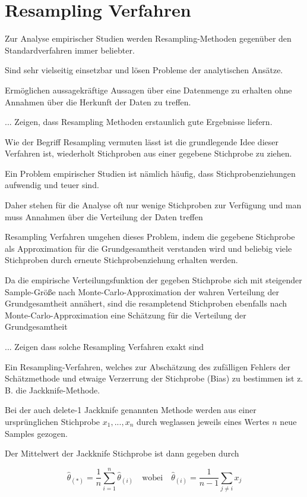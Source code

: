 \section{Resampling Verfahren}
Zur Analyse empirischer Studien werden Resampling-Methoden gegenüber den Standardverfahren immer beliebter.

Sind sehr vielseitig einsetzbar und lösen Probleme der analytischen Ansätze.

Ermöglichen aussagekräftige Aussagen über eine Datenmenge zu erhalten ohne Annahmen über die Herkunft der Daten zu treffen.

... Zeigen, dass Resampling Methoden erstaunlich gute Ergebnisse liefern.

Wie der Begriff Resampling vermuten lässt ist die grundlegende Idee dieser Verfahren ist, wiederholt Stichproben aus einer gegebene Stichprobe zu ziehen.

Ein Problem empirischer Studien ist nämlich häufig, dass Stichprobenziehungen aufwendig und teuer sind.

Daher stehen für die Analyse oft nur wenige Stichproben zur Verfügung und man muss Annahmen über die Verteilung der Daten treffen

Resampling Verfahren umgehen dieses Problem, indem die gegebene Stichprobe als Approximation für die Grundgesamtheit verstanden wird und beliebig viele Stichproben durch erneute Stichprobenziehung erhalten werden.

Da die empirische Verteilungsfunktion der gegeben Stichprobe sich mit steigender Sample-Größe nach Monte-Carlo-Approximation der wahren Verteilung der Grundgesamtheit annähert, sind die resampletend Stichproben ebenfalls nach Monte-Carlo-Approximation eine Schätzung für die Verteilung der Grundgesamtheit

... Zeigen dass solche Resampling Verfahren exakt sind

Ein Resampling-Verfahren, welches zur Abschätzung des zufälligen Fehlers der Schätzmethode und etwaige Verzerrung der Stichprobe (Bias) zu bestimmen ist z. B. die Jackknife-Methode.

Bei der auch delete-1 Jackknife genannten Methode werden aus einer ursprünglichen Stichprobe $x_1, ..., x_n$ durch weglassen jeweils eines Wertes $n$ neue Samples gezogen. 

Der Mittelwert der Jackknife Stichprobe ist dann gegeben durch 

\begin{equation}
\hat{\theta}_{(*)} = \frac{1}{n} \sum_{i = 1}^{n} \hat{\theta}_{(i)}
\quad\text{wobei}\quad
\hat{\theta}_{(i)} = \frac{1}{n-1} \sum_{j \neq i} x_j
\end{equation}

